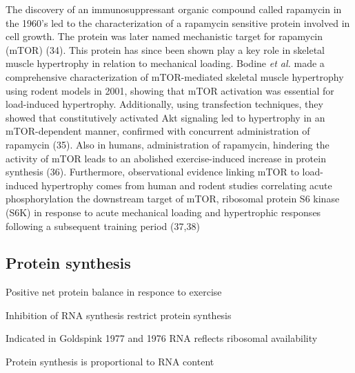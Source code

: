 \documentclass[twoside,10pt]{gihclass} %
\begin{document}
The discovery of an immunosuppressant organic compound called rapamycin in the 1960's led to the characterization of a rapamycin sensitive protein involved in cell growth. The protein was later named mechanistic target for rapamycin (mTOR)
(34). This protein has since been shown play a key role in skeletal muscle hypertrophy in relation to mechanical loading. Bodine \emph{et al.} made a comprehensive characterization of mTOR-mediated skeletal muscle hypertrophy using rodent models in 2001, showing that mTOR activation was essential for load-induced hypertrophy. Additionally, using transfection techniques, they showed that constitutively activated Akt signaling led to hypertrophy in an mTOR-dependent manner, confirmed with concurrent administration of rapamycin (35).
Also in humans, administration of rapamycin, hindering the activity of mTOR leads to an abolished exercise-induced increase in protein synthesis
(36). Furthermore, observational evidence linking mTOR to load-induced hypertrophy comes from human and rodent studies correlating acute phosphorylation the downstream target of mTOR, ribosomal protein S6 kinase (S6K) in response to acute mechanical loading and hypertrophic responses following a subsequent training period
(37,38)

\hypertarget{protein-synthesis}{%
\subsection{Protein synthesis}\label{protein-synthesis}}

Positive net protein balance in responce to exercise

Inhibition of RNA synthesis restrict protein synthesis

Indicated in Goldspink 1977 and 1976 RNA reflects ribosomal availability

Protein synthesis is proportional to RNA content
\end{document}
